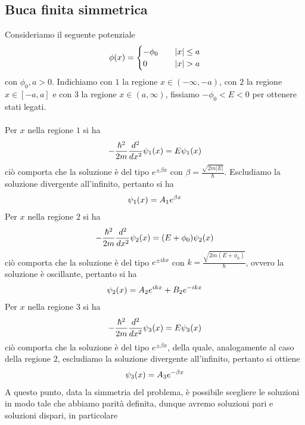 \documentclass{article}
\begin{document}
\subsection{Buca finita simmetrica}
Consideriamo il seguente potenziale
\begin{gather}
    \phi(x) = \begin{cases}
        -\phi_0 \quad &|x| \leq a \\
        0 \quad &|x| > a
    \end{cases} \notag
\end{gather}
con $\phi_0, a > 0$. Indichiamo con $1$ la regione $x \in (-\infty, -a)$, con $2$ la regione $x \in [-a, a]$ e con $3$ la regione $x \in (a, \infty)$, fissiamo $-\phi_0 < E < 0$ per ottenere stati legati. \\ \\
Per $x$ nella regione $1$ si ha
\begin{gather}
    -\frac{\hbar^2}{2m}\frac{d^2}{dx^2}\psi_1(x) = E\psi_1(x) \notag
\end{gather}
ciò comporta che la soluzione è del tipo $e^{\pm\beta x}$ con $\beta = \frac{\sqrt{2m|E|}}{\hbar}$. Escludiamo la soluzione divergente all'infinito, pertanto si ha
\begin{gather}
    \psi_1(x) = A_1e^{\beta x} \notag
\end{gather}
Per $x$ nella regione $2$ si ha
\begin{gather}
    -\frac{\hbar^2}{2m}\frac{d^2}{dx^2}\psi_2(x) = (E + \phi_0)\psi_2(x) \notag
\end{gather}
ciò comporta che la soluzione è del tipo $e^{\pm ikx}$ con $k = \frac{\sqrt{2m(E + \phi_0)}}{\hbar}$, ovvero la soluzione è oscillante, pertanto si ha
\begin{gather}
    \psi_2(x) = A_2e^{ikx} + B_2e^{-ikx} \notag
\end{gather}
Per $x$ nella regione $3$ si ha
\begin{gather}
    -\frac{\hbar^2}{2m}\frac{d^2}{dx^2}\psi_3(x) = E\psi_3(x) \notag
\end{gather}
ciò comporta che la soluzione è del tipo $e^{\pm \beta x}$, della quale, analogamente al caso della regione $2$, escludiamo la soluzione divergente all'infinito, pertanto si ottiene
\begin{gather}
    \psi_3(x) = A_3e^{-\beta x} \notag
\end{gather}
A questo punto, data la simmetria del problema, è possibile scegliere le soluzioni in modo tale che abbiamo parità definita, dunque avremo soluzioni pari e soluzioni dispari, in particolare
\end{document}
